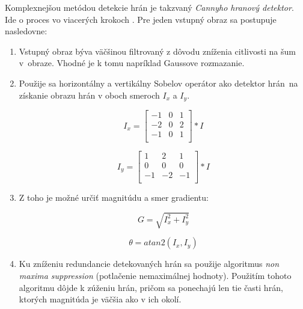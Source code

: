     Komplexnejšou metódou detekcie hrán je takzvaný \emph{Cannyho hranový detektor}. Ide o proces vo viacerých krokoch \cite{Samina2023}. Pre jeden vstupný obraz sa postupuje nasledovne:

    \begin{enumerate}
        \item Vstupný obraz býva väčšinou filtrovaný z dôvodu zníženia citlivosti na šum v~obraze. Vhodné je k tomu napríklad Gaussove rozmazanie.
        
        \item Použije sa horizontálny a vertikálny Sobelov operátor ako detektor hrán~na získanie obrazu hrán v oboch smeroch \(I_{x}\) a \(I_{y}\).

        \begin{minipage}[b]{0.4\textwidth}
            \[I_{x} = 
            \begin{bmatrix}
                -1 & 0 & 1 \\
                -2 & 0 & 2 \\
                -1 & 0 & 1 \\
            \end{bmatrix}
            \ast I
            \]
        \end{minipage}
        \begin{minipage}[b]{0.4\textwidth}
            \[I_{y} = 
            \begin{bmatrix}
                 1 &  2 &  1 \\
                 0 &  0 &  0 \\
                -1 & -2 & -1 \\
            \end{bmatrix}
            \ast I
            \]
        \end{minipage}

        \item Z toho je možné určiť magnitúdu a smer gradientu:
        
        \begin{minipage}[b]{0.4\textwidth}
            \[G = \sqrt{I_x^2 + I_y^2}\]
        \end{minipage}
        \begin{minipage}[b]{0.4\textwidth}
            \[\theta = atan2(I_x, I_y)\]
        \end{minipage}
        
        \item Ku zníženiu redundancie detekovaných hrán sa použije algoritmus \emph{non maxima suppression} (potlačenie nemaximálnej hodnoty). Použitím tohoto algoritmu dôjde k zúženiu hrán, pričom sa ponechajú len tie časti hrán, ktorých magnitúda je väčšia ako v ich okolí.
        

\end{enumerate}

